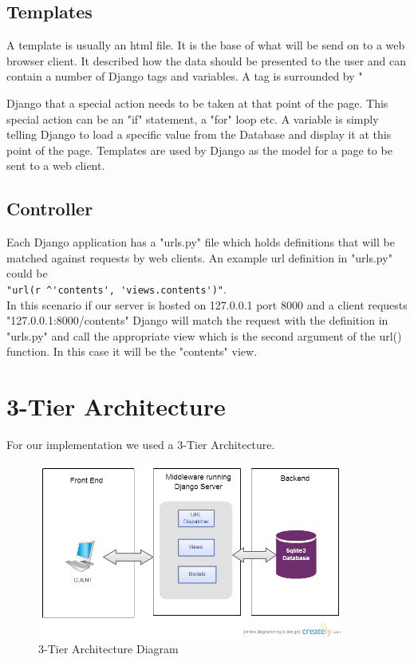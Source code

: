 \documentclass{l3proj}
\begin{document}
\subsection{Templates}
A template is usually an html file. It is the base of what will be send on to a web browser 
client. It described how the data should be presented to the user and can contain a 
number of Django tags and variables. A tag is surrounded by "{%
Django that a special action needs to be taken at that point of the page. This special 
action can be an "if" statement, a "for" loop etc. A variable is simply telling Django to load 
a specific value from the Database and display it at this point of the page. Templates are 
used by Django as the model for a page to be sent to a web client.
\subsection{Controller}
Each Django application has a "urls.py" file which holds definitions that will be matched 
against requests by web clients. An example url definition in "urls.py" could be \\
\verb|"url(r ^'contents', 'views.contents')"|. \\In this scenario if our server is hosted on 127.0.0.1 
port 8000 and a client requests "127.0.0.1:8000/contents" Django will match the 
request with the definition in "urls.py" and call the appropriate view which is the second 
argument of the url() function. In this case it will be the "contents" view.
\section{3-Tier Architecture}
For our implementation we used a 3-Tier Architecture.
\begin{figure}[!htb]
\caption{3-Tier Architecture Diagram}
 \centering
\includegraphics[width=0.9\textwidth]{images/ntier.jpg}
\end{figure}
}
\end{document}
